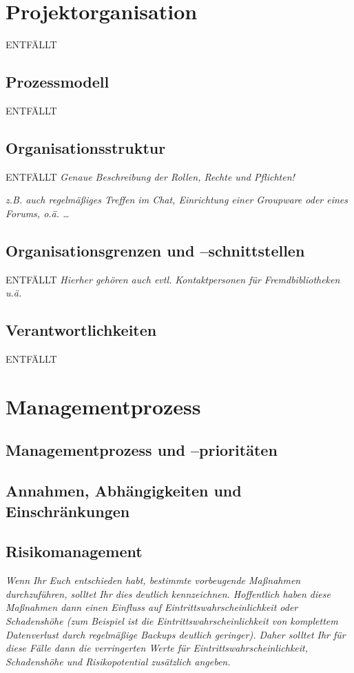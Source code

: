 \documentclass[fontsize=12pt,paper=a4,twoside]{scrartcl}
\begin{document}
\section{Projektorganisation}
ENTFÄLLT
\subsection{Prozessmodell}
ENTFÄLLT
\subsection{Organisationsstruktur}
ENTFÄLLT
{\em Genaue Beschreibung der Rollen, Rechte und Pflichten!}

{\em z.B. auch regelmäßiges Treffen im Chat, Einrichtung einer
  Groupware oder eines Forums, o.ä. \dots}

\subsection{Organisationsgrenzen und --schnittstellen}
ENTFÄLLT
{\em Hierher gehören auch evtl. Kontaktpersonen für Fremdbibliotheken u.ä.}

\subsection{Verantwortlichkeiten}
ENTFÄLLT
\section{Managementprozess}

\subsection{Managementprozess und --prioritäten}

\subsection{Annahmen, Abhängigkeiten und Einschränkungen}

\subsection{Risikomanagement}\label{riskmanagement}

{\em Wenn Ihr Euch entschieden habt, bestimmte vorbeugende Maßnahmen 
     durchzuführen, solltet Ihr dies deutlich kennzeichnen. Hoffentlich
     haben diese Maßnahmen dann einen Einfluss auf Eintrittswahrscheinlichkeit oder Schadenshöhe (zum Beispiel
     ist die Eintrittswahrscheinlichkeit von komplettem Datenverlust durch regelmäßige Backups deutlich 
     geringer). Daher solltet Ihr für diese Fälle dann die verringerten Werte für Eintrittswahrscheinlichkeit, 
     Schadenshöhe und Risikopotential zusätzlich angeben. }
\end{document}
